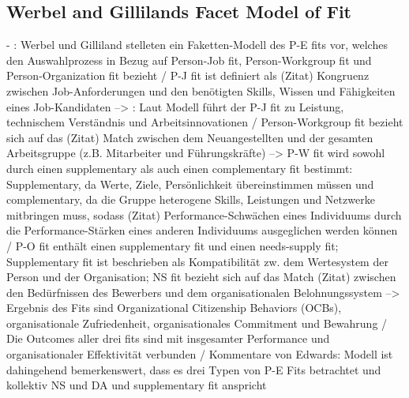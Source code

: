 \subsection{Werbel and Gillilands Facet Model of Fit}
\label{ch:notizen:rekcruitingUndSelektion:werbel}
- \cite[S. 37]{edwards:2008}: Werbel und Gilliland stelleten ein Faketten-Modell des P-E fits vor, welches den Auswahlprozess in Bezug auf Person-Job fit, Person-Workgroup fit und Person-Organization fit bezieht / P-J fit ist definiert als (Zitat) Kongruenz zwischen Job-Anforderungen und den benötigten Skills, Wissen und Fähigkeiten eines Job-Kandidaten --> \cite[S. 38]{edwards:2008}: Laut 
Modell führt der P-J fit zu Leistung, technischem Verständnis und Arbeitsinnovationen / Person-Workgroup fit bezieht sich auf das (Zitat) Match zwischen dem Neuangestellten und der gesamten Arbeitsgruppe (z.B. Mitarbeiter und Führungskräfte) --> P-W fit wird sowohl durch einen supplementary als auch einen complementary fit bestimmt: Supplementary, da Werte, Ziele, Persönlichkeit übereinstimmen müssen und complementary, da die Gruppe heterogene Skills, Leistungen und Netzwerke mitbringen muss, sodass (Zitat) Performance-Schwächen eines Individuums durch die Performance-Stärken eines anderen Individuums ausgeglichen werden können / P-O fit enthält einen supplementary fit und einen needs-supply fit; Supplementary fit ist beschrieben als Kompatibilität zw. dem Wertesystem der Person und der Organisation; NS fit bezieht sich auf das Match (Zitat) zwischen den Bedürfnissen des Bewerbers und dem organisationalen Belohnungssystem --> Ergebnis des Fits sind Organizational Citizenship Behaviors (OCBs), organisationale Zufriedenheit, organisationales Commitment und Bewahrung / Die Outcomes aller drei fits sind mit insgesamter Performance und organisationaler Effektivität verbunden / Kommentare von Edwards: Modell ist dahingehend bemerkenswert, dass es drei Typen von P-E Fits betrachtet und kollektiv NS und DA und supplementary fit anspricht

